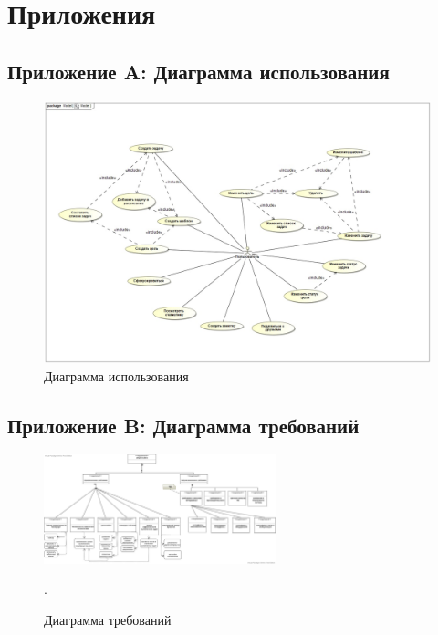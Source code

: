 \chapter{Приложения}
\section{Приложение A: Диаграмма использования}
\begin{figure}[h]
    \centering
    \includegraphics[angle=90,height=0.7\textheight]{img/use-case-diagram.jpg}
    \caption{Диаграмма использования} 
    \label{fig:use_case_diagram}
\end{figure}

\newpage
\section{Приложение B: Диаграмма требований}
\begin{figure}[h]
    \centering
    \includegraphics[angle=90,height=0.7\textheight,width=0.6\textwidth]{img/requirement-diagram.jpg}
    \caption{Диаграмма требований} 
    \label{fig:requirement_diagram}.
\end{figure}
